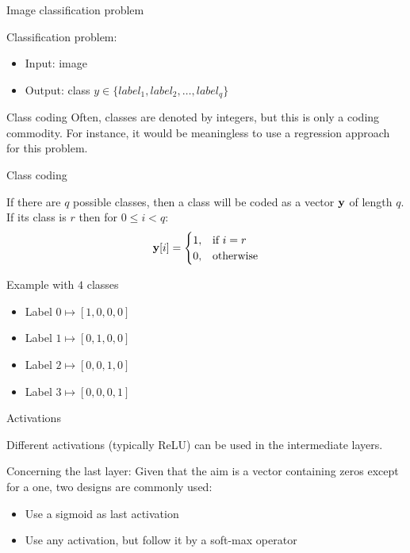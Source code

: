 \documentclass[xcolor=pdftex,dvipsnames,table,mathserif]{beamer}
\begin{document}
\begin{frame}{Image classification problem}

  Classification problem:
  \begin{itemize}
  \item Input: image
  \item Output: class $y \in \{ label_1, label_2, \ldots, label_q\}$
  \end{itemize}

  \begin{block}{Class coding}
    Often, classes are denoted by integers, but this is only a coding commodity. For instance, it would be meaningless to use a regression approach for this problem.
  \end{block}

\end{frame}

\begin{frame}{Class coding}

  If there are $q$ possible classes, then a class will be coded as a vector $\mathbf{y}$ of length $q$. If its class is $r$  then for $0 \leq i < q$:
  \[
  \mathbf{y}[i] =
  \begin{cases}
    1, & \text{if}\ i=r \\
    0, & \text{otherwise}
  \end{cases}
  \]

  \begin{block}{Example with $4$ classes}
    \begin{itemize}
    \item
      Label $0 \longmapsto [1,0,0,0]$
    \item
      Label $1 \longmapsto [0,1,0,0]$
    \item
      Label $2 \longmapsto [0,0,1,0]$
    \item
      Label $3 \longmapsto [0,0,0,1]$
    \end{itemize}
  \end{block}

\end{frame}


\begin{frame}{Activations}

  Different activations (typically ReLU) can be used in the intermediate layers.
  \vspace{1em}

  Concerning the last layer: Given that the aim is a vector containing zeros except for a one, two designs are commonly used:

  \begin{itemize}
  \item Use a sigmoid as last activation
  \item Use any activation, but follow it by a soft-max operator
  \end{itemize}

\end{frame}
\end{document}
